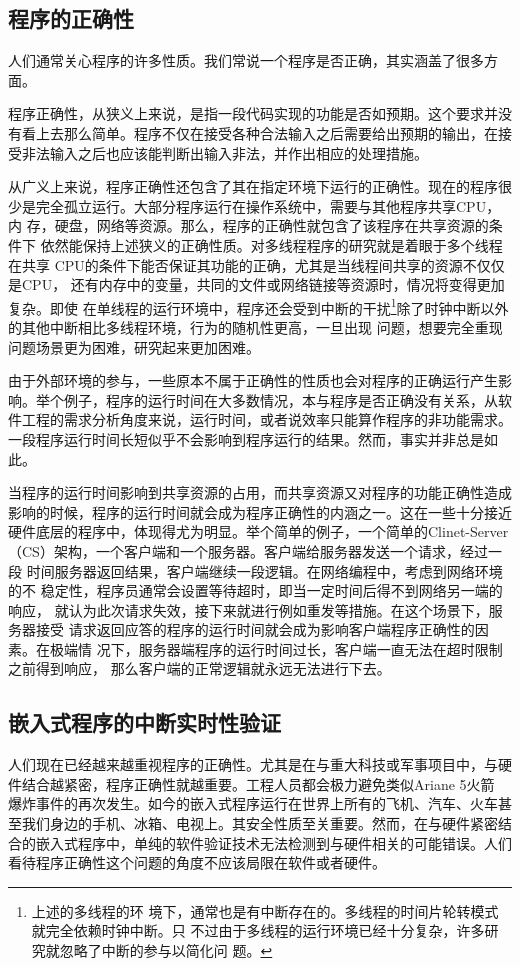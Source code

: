 \subsection{程序的正确性}
\label{subsec:correctness}
人们通常关心程序的许多性质。我们常说一个程序是否正确，其实涵盖了很多方面。

程序正确性，从狭义上来说，是指一段代码实现的功能是否如预期。这个要求并没
有看上去那么简单。程序不仅在接受各种合法输入之后需要给出预期的输出，在接
受非法输入之后也应该能判断出输入非法，并作出相应的处理措施。

从广义上来说，程序正确性还包含了其在指定环境下运行的正确性。现在的程序很
少是完全孤立运行。大部分程序运行在操作系统中，需要与其他程序共享CPU，内
存，硬盘，网络等资源。那么，程序的正确性就包含了该程序在共享资源的条件下
依然能保持上述狭义的正确性质。对多线程程序的研究就是着眼于多个线程在共享
CPU的条件下能否保证其功能的正确，尤其是当线程间共享的资源不仅仅是CPU，
还有内存中的变量，共同的文件或网络链接等资源时，情况将变得更加复杂。即使
在单线程的运行环境中，程序还会受到中断的干扰\footnote{上述的多线程的环
境下，通常也是有中断存在的。多线程的时间片轮转模式就完全依赖时钟中断。只
不过由于多线程的运行环境已经十分复杂，许多研究就忽略了中断的参与以简化问
题。}除了时钟中断以外的其他中断相比多线程环境，行为的随机性更高，一旦出现
问题，想要完全重现问题场景更为困难，研究起来更加困难。

由于外部环境的参与，一些原本不属于正确性的性质也会对程序的正确运行产生影
响。举个例子，程序的运行时间在大多数情况，本与程序是否正确没有关系，从软
件工程的需求分析角度来说，运行时间，或者说效率只能算作程序的非功能需求。
一段程序运行时间长短似乎不会影响到程序运行的结果。然而，事实并非总是如此。

当程序的运行时间影响到共享资源的占用，而共享资源又对程序的功能正确性造成
影响的时候，程序的运行时间就会成为程序正确性的内涵之一。这在一些十分接近
硬件底层的程序中，体现得尤为明显。举个简单的例子，一个简单的Clinet-Server
（CS）架构，一个客户端和一个服务器。客户端给服务器发送一个请求，经过一段
时间服务器返回结果，客户端继续一段逻辑。在网络编程中，考虑到网络环境的不
稳定性，程序员通常会设置等待超时，即当一定时间后得不到网络另一端的响应，
就认为此次请求失效，接下来就进行例如重发等措施。在这个场景下，服务器接受
请求返回应答的程序的运行时间就会成为影响客户端程序正确性的因素。在极端情
况下，服务器端程序的运行时间过长，客户端一直无法在超时限制之前得到响应，
那么客户端的正常逻辑就永远无法进行下去。

\subsection{嵌入式程序的中断实时性验证}
\label{subsec:embedded_intr}
人们现在已经越来越重视程序的正确性。尤其是在与重大科技或军事项目中，与硬
件结合越紧密，程序正确性就越重要。工程人员都会极力避免类似Ariane 5火箭
爆炸事件的再次发生。如今的嵌入式程序运行在世界上所有的飞机、汽车、火车甚
至我们身边的手机、冰箱、电视上。其安全性质至关重要。然而，在与硬件紧密结
合的嵌入式程序中，单纯的软件验证技术无法检测到与硬件相关的可能错误。人们
看待程序正确性这个问题的角度不应该局限在软件或者硬件。

